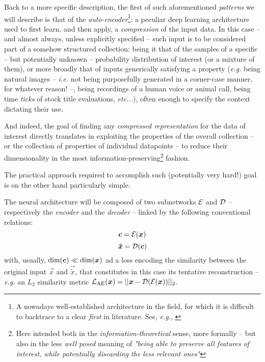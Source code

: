 Back to a more specific description, the first of such aforementioned \textit{patterns} we will describe is that of the \textit{auto-encoder}\footnote{A nowadays well-established architecture in the field, for which it is difficult to backtrace to a clear \textit{first} in literature. See, \textit{e.g.}, \cite{Kramer1991Autoencoders}}: a peculiar deep learning architecture used to first learn, and then apply, a \textit{compression} of the input data. In this case -- and almost always, unless explicitly specified -- such input is to be considered part of a somehow structured collection: being it that of the samples of a specific -- but potentially unknown -- probability distribution of interest (or a mixture of them), or more broadly that of inputs generically satisfying a property (\textit{e.g.} being natural images -- \textit{i.e.} not being purposefully generated in a corner-case manner, for whatever reason! --, being recordings of a human voice or animal call, being time \textit{ticks} of stock title evaluations, \textit{etc...}), often enough to specify the context dictating their use.

And indeed, the goal of finding any \textit{compressed representation} for the data of interest directly translates in exploiting the properties of the overall collection -- or the collection of properties of individual datapoints -- to reduce their dimensionality in the most information-preserving\footnote{Here intended both in the \textit{information-theoretical} sense, more formally -- but also in the less \textit{well posed} meaning of \textit{"being able to preserve all features of interest, while potentially discarding the less relevant ones"}} fashion.

The practical approach required to accomplish such (potentially very hard!) goal is on the other hand particularly simple.

The neural architecture will be composed of two subnetworks $\mathcal{E}$ and $\mathcal{D}$ -- respectively the \textit{encoder} and the \textit{decoder} -- linked by the following conventional relations:
$$\bm{c} = \mathcal{E}(\bm{x})$$
$$\bm{\tilde{x}} = \mathcal{D}(\bm{c})$$
with, usually, $\text{dim}(\bm{c}) \ll \text{dim}(\bm{x})$ ad a loss encoding the similarity between the original input $\vec{x}$ and $\vec{\tilde{x}}$, that constitutes in this case its tentative reconstruction -- \textit{e.g.} an $L_2$ similarity metric \suchthat $\mathcal{L}_{\text{AE}}(\bm{x}) = ||\bm{x} - \mathcal{D}(\mathcal{E}(\bm{x}))||_2$.

